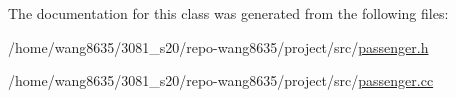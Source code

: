 The documentation for this class was generated from the following files\+:\begin{DoxyCompactItemize}
\item 
/home/wang8635/3081\+\_\+s20/repo-\/wang8635/project/src/\hyperlink{passenger_8h}{passenger.\+h}\item 
/home/wang8635/3081\+\_\+s20/repo-\/wang8635/project/src/\hyperlink{passenger_8cc}{passenger.\+cc}\end{DoxyCompactItemize}

